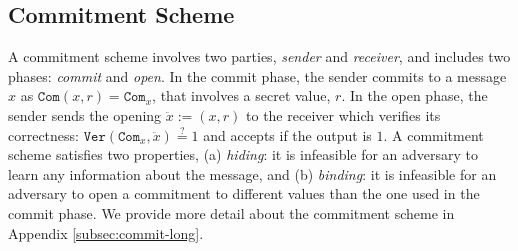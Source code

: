 
\vspace{-3.6mm}


\subsection{Commitment Scheme}\label{subsec:commit}

\vspace{-1.2mm}
A commitment scheme involves two parties,  \emph{sender} and  \emph{receiver}, and includes  two phases: \emph{commit} and  \emph{open}. In the commit phase, the sender  commits to a message $x$ as $\mathtt{Com}(x,r)=\mathtt{Com}_{\scriptscriptstyle x}$, that involves a secret value,  $r$. In the open phase, the sender sends the opening $\ddot{x}:=(x,r)$ to the receiver which verifies its correctness: $\mathtt{Ver}(\mathtt{Com}_{\scriptscriptstyle x},\ddot{x})\stackrel{\scriptscriptstyle ?}=1$ and accepts if the output is $1$.  A commitment scheme  satisfies two properties, (a) \textit{hiding}: it is infeasible for an adversary to learn any information about the   message, and (b) \textit{binding}: it is infeasible for an adversary to open a commitment  to different values  than the one  used in the commit phase. We provide more detail about the commitment scheme  in Appendix \ref{subsec:commit-long}. 



